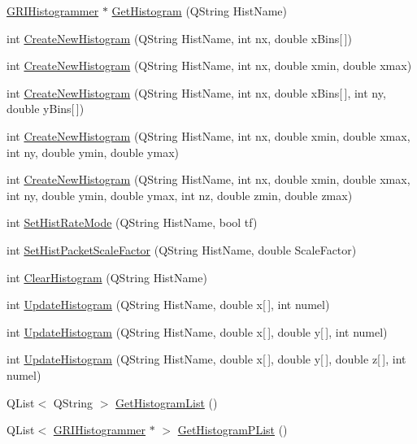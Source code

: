 \begin{DoxyCompactItemize}
\hyperlink{classGRIHistogrammer}{\-G\-R\-I\-Histogrammer} $\ast$ \hyperlink{classGRIAnalysisThread_ac7afd9b97c9b3b18ede0ff28e85c18c4}{\-Get\-Histogram} (\-Q\-String \-Hist\-Name)
\item 
int \hyperlink{classGRIAnalysisThread_a42291c32833bda1e9bc83eb04acbcf4b}{\-Create\-New\-Histogram} (\-Q\-String \-Hist\-Name, int nx, double x\-Bins\mbox{[}$\,$\mbox{]})
\item 
int \hyperlink{classGRIAnalysisThread_ab8798b2dcabf2d63c906ff436c92898b}{\-Create\-New\-Histogram} (\-Q\-String \-Hist\-Name, int nx, double xmin, double xmax)
\item 
int \hyperlink{classGRIAnalysisThread_a0f92fffe759ec79986a93d883ca0ea4b}{\-Create\-New\-Histogram} (\-Q\-String \-Hist\-Name, int nx, double x\-Bins\mbox{[}$\,$\mbox{]}, int ny, double y\-Bins\mbox{[}$\,$\mbox{]})
\item 
int \hyperlink{classGRIAnalysisThread_a4da29079cdf83d312baf9ec46dbcb974}{\-Create\-New\-Histogram} (\-Q\-String \-Hist\-Name, int nx, double xmin, double xmax, int ny, double ymin, double ymax)
\item 
int \hyperlink{classGRIAnalysisThread_ab29571358912821bd3cb0f5507387b7b}{\-Create\-New\-Histogram} (\-Q\-String \-Hist\-Name, int nx, double xmin, double xmax, int ny, double ymin, double ymax, int nz, double zmin, double zmax)
\item 
int \hyperlink{classGRIAnalysisThread_acf9485402c017729819749079349608b}{\-Set\-Hist\-Rate\-Mode} (\-Q\-String \-Hist\-Name, bool tf)
\item 
int \hyperlink{classGRIAnalysisThread_adc3541da735117e8e6cc272398899225}{\-Set\-Hist\-Packet\-Scale\-Factor} (\-Q\-String \-Hist\-Name, double \-Scale\-Factor)
\item 
int \hyperlink{classGRIAnalysisThread_a5aa10ef8b16c646b2f9a0036f8aa615e}{\-Clear\-Histogram} (\-Q\-String \-Hist\-Name)
\item 
int \hyperlink{classGRIAnalysisThread_a6cb6342aded15cd7aea2318a1cde32e8}{\-Update\-Histogram} (\-Q\-String \-Hist\-Name, double x\mbox{[}$\,$\mbox{]}, int numel)
\item 
int \hyperlink{classGRIAnalysisThread_ae0aae856fcb02edaf98ed755c8b26305}{\-Update\-Histogram} (\-Q\-String \-Hist\-Name, double x\mbox{[}$\,$\mbox{]}, double y\mbox{[}$\,$\mbox{]}, int numel)
\item 
int \hyperlink{classGRIAnalysisThread_ab87fc59539373f2daef1acec426f94ff}{\-Update\-Histogram} (\-Q\-String \-Hist\-Name, double x\mbox{[}$\,$\mbox{]}, double y\mbox{[}$\,$\mbox{]}, double z\mbox{[}$\,$\mbox{]}, int numel)
\item 
\-Q\-List$<$ \-Q\-String $>$ \hyperlink{classGRIAnalysisThread_a7e6cf77f21254c544045f58f4633af06}{\-Get\-Histogram\-List} ()
\item 
\-Q\-List$<$ \hyperlink{classGRIHistogrammer}{\-G\-R\-I\-Histogrammer} $\ast$ $>$ \hyperlink{classGRIAnalysisThread_a57f4260ae73f93dbf2e3d8370ba76c52}{\-Get\-Histogram\-P\-List} ()
\end{DoxyCompactItemize}
